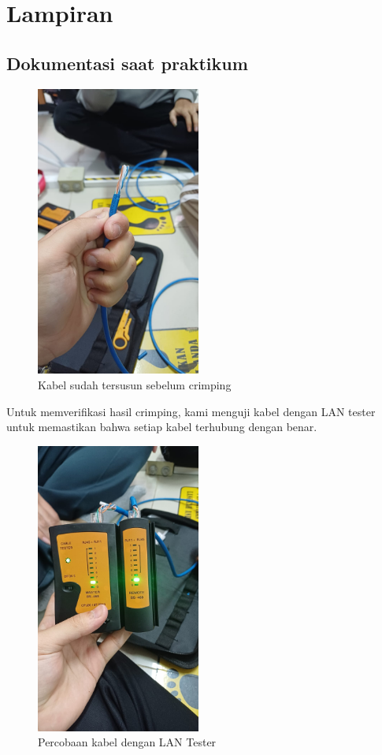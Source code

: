 \newpage
\section{Lampiran}
\subsection{Dokumentasi saat praktikum}

\begin{figure}[H]
    \centering
    \includegraphics[width=0.48\textwidth]{P1/img/Crimping 2.jpeg}
    \caption{Kabel sudah tersusun sebelum crimping}
    \label{fig:crimping2_lampiran}
\end{figure}

Untuk memverifikasi hasil crimping, kami menguji kabel dengan LAN tester untuk memastikan bahwa setiap kabel terhubung dengan benar. 

\begin{figure}[H]
    \centering
    \includegraphics[width=0.48\textwidth]{P1/img/Crimping 3.jpeg}
    \caption{Percobaan kabel dengan LAN Tester}
    \label{fig:crimping3_lampiran}
\end{figure}

